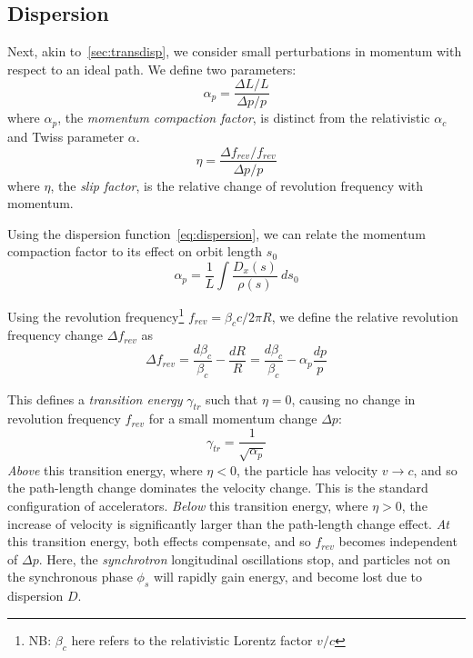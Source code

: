 \documentclass[11pt]{report}
\begin{document}
\subsection{Dispersion}

Next, akin to~\autoref{sec:transdisp}, we consider small perturbations in momentum with respect to an ideal path. We define two parameters:
\begin{equation}
  \alpha_p = \frac{\Delta L/L}{\Delta p/p}
\end{equation} where $\alpha_p$, the \textit{momentum compaction factor}, is distinct from the relativistic $\alpha_c$ and Twiss parameter $\alpha$.
\begin{equation}
  \eta = \frac{\Delta f_{rev}/f_{rev}}{\Delta p/p}
  \label{eq:slip_factor}
\end{equation} where $\eta$, the \textit{slip factor}, is the relative change of revolution frequency with momentum.

Using the dispersion function~\autoref{eq:dispersion}, we can relate the momentum compaction factor to its effect on orbit length $s_0$~\cite[5.1]{lbd:tecker}
\begin{equation}
  \alpha_p=\frac 1L\int\frac{D_x(s)}{\rho(s)}\ ds_0
\end{equation}

Using the revolution frequency\footnote{NB: $\beta_c$ here refers to the relativistic Lorentz factor $v/c$ } $f_{rev}=\beta_c c/2\pi R$, we define the relative revolution frequency change $\Delta f_{rev}$ as
\begin{equation}
  \Delta f_{rev} = \frac{d\beta_c}{\beta_c}-\frac{dR}R=\frac{d\beta_c}{\beta_c}-\alpha_p\frac{dp}p
\end{equation} 



This defines a \textit{transition energy} $\gamma_{tr}$ such that $\eta=0$, causing no change in revolution frequency $f_{rev}$ for a small momentum change $\Delta p$:
\begin{equation}
  \gamma_{tr}=\frac 1{\sqrt{\alpha_p}}
\end{equation}
\textit{Above} this transition energy, where $\eta<0$, the particle has velocity $v\rightarrow c$, and so the path-length change dominates the velocity change. This is the standard configuration of accelerators.
\textit{Below} this transition energy, where $\eta >0$, the increase of velocity is significantly larger than the path-length change effect.
\textit{At} this transition energy, both effects compensate, and so $f_{rev}$ becomes independent of $\Delta p$. Here, the \textit{synchrotron} longitudinal oscillations stop, and particles not on the synchronous phase $\phi_s$ will rapidly gain energy, and become lost due to dispersion $D$.
\end{document}

